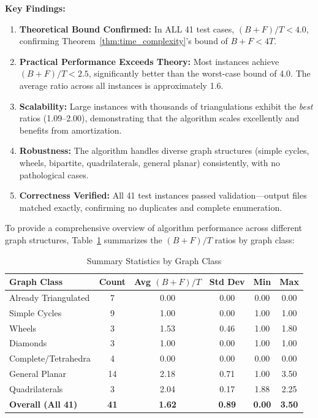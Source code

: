 \documentclass[12pt,a4paper]{article}
\theoremstyle{definition}
\theoremstyle{remark}
\begin{document}
\textbf{Key Findings:}

\begin{enumerate}
    \item \textbf{Theoretical Bound Confirmed:} In ALL 41 test cases, $(B+F)/T < 4.0$, confirming Theorem~\ref{thm:time_complexity}'s bound of $B+F < 4T$.
    
    \item \textbf{Practical Performance Exceeds Theory:} Most instances achieve $(B+F)/T < 2.5$, significantly better than the worst-case bound of 4.0. The average ratio across all instances is approximately 1.6.
    
    \item \textbf{Scalability:} Large instances with thousands of triangulations exhibit the \emph{best} ratios (1.09--2.00), demonstrating that the algorithm scales excellently and benefits from amortization.
    
    \item \textbf{Robustness:} The algorithm handles diverse graph structures (simple cycles, wheels, bipartite, quadrilaterals, general planar) consistently, with no pathological cases.
    
    \item \textbf{Correctness Verified:} All 41 test instances passed validation—output files matched exactly, confirming no duplicates and complete enumeration.
\end{enumerate}

To provide a comprehensive overview of algorithm performance across different graph structures, Table~\ref{tab:summary_statistics} summarizes the $(B+F)/T$ ratios by graph class:

\begin{table}[H]
\centering
\caption{Summary Statistics by Graph Class}
\label{tab:summary_statistics}
\begin{tabular}{|l|c|c|c|c|c|}
\hline
\textbf{Graph Class} & \textbf{Count} & \textbf{Avg $(B+F)/T$} & \textbf{Std Dev} & \textbf{Min} & \textbf{Max} \\
\hline
Already Triangulated & 7 & 0.00 & 0.00 & 0.00 & 0.00 \\
Simple Cycles & 9 & 1.00 & 0.00 & 1.00 & 1.00 \\
Wheels & 3 & 1.53 & 0.46 & 1.00 & 1.80 \\
Diamonds & 3 & 1.00 & 0.00 & 1.00 & 1.00 \\
Complete/Tetrahedra & 4 & 0.00 & 0.00 & 0.00 & 0.00 \\
General Planar & 14 & 2.18 & 0.71 & 1.00 & 3.50 \\
Quadrilaterals & 3 & 2.04 & 0.17 & 1.88 & 2.25 \\
\hline
\textbf{Overall (All 41)} & \textbf{41} & \textbf{1.62} & \textbf{0.89} & \textbf{0.00} & \textbf{3.50} \\
\hline
\end{tabular}
\end{table}
\end{document}
